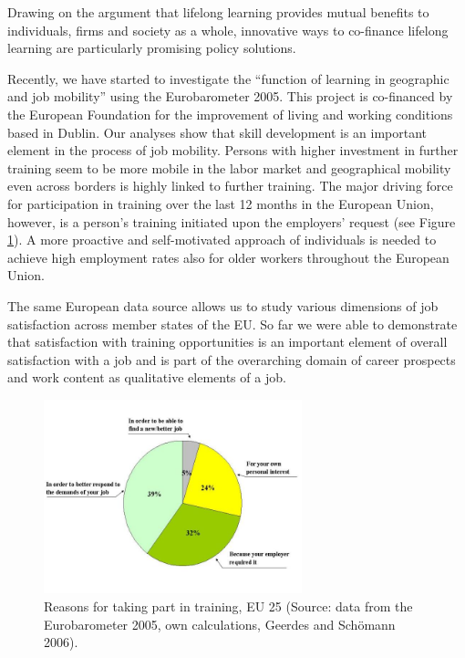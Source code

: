  Drawing on the argument that lifelong learning provides mutual benefits to individuals, firms and society as a whole, innovative ways to co-finance lifelong learning are particularly promising policy solutions.

 Recently, we have started to investigate the ``function of learning in geographic and job mobility'' using the Eurobarometer 2005. This project is co-financed by the European Foundation for the improvement of living and working conditions based in Dublin. Our analyses show that skill development is an important element in the process of job mobility. Persons with higher investment in further training seem to be more mobile in the labor market and geographical mobility even across borders is highly linked to further training. The major driving force for participation in training over the last 12 months in the European Union, however, is a person's training initiated upon the employers' request (see Figure \ref{fig1:profKlausSchoemann}). A more proactive and self-motivated approach of individuals is needed to achieve high employment  rates also for older workers throughout the European Union. 

 The same European data source allows us to study various dimensions of job satisfaction across member states of the EU. So far we were able to demonstrate that satisfaction with training opportunities is an important element of overall satisfaction with a job and is part of the overarching domain of career prospects and work content as qualitative elements of a job.

\begin{figure}[ht]
  \begin{center}
    \includegraphics[width=7.5cm]{profKlausSchoemann-fig1.jpg}
    \caption{Reasons for taking part in training, EU 25 (Source: data from the Eurobarometer 2005, own calculations, Geerdes and Sch\"{o}mann 2006).}\label{fig1:profKlausSchoemann}
   \end{center}
\end{figure}

